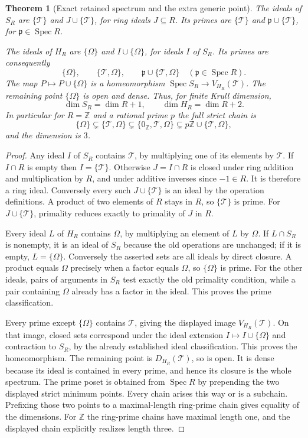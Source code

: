 \documentclass[11pt]{article}
\newtheorem{theorem}{Theorem}
\newcommand{\Z}{\mathbb Z}
\newcommand{\Sp}{\operatorname{Spec}}
\begin{document}
\begin{theorem}[Exact retained spectrum and the extra generic point]
The ideals of $S_R$ are $\{\mathcal T\}$ and $J\cup\{\mathcal T\}$, for ring ideals $J\subseteq R$. Its primes are $\{\mathcal T\}$ and $\mathfrak p\cup\{\mathcal T\}$, for $\mathfrak p\in\Sp R$.

The ideals of $H_R$ are $\{\Omega\}$ and $I\cup\{\Omega\}$, for ideals $I$ of $S_R$. Its primes are consequently
\[
\{\Omega\},\qquad \{\mathcal T,\Omega\},\qquad
\mathfrak p\cup\{\mathcal T,\Omega\}\quad(\mathfrak p\in\Sp R).
\]
The map $P\mapsto P\cup\{\Omega\}$ is a homeomorphism $\Sp S_R\to V_{H_R}(\mathcal T)$. The remaining point $\{\Omega\}$ is open and dense. Thus, for finite Krull dimension,
\[
\dim S_R=\dim R+1,\qquad \dim H_R=\dim R+2.
\]
In particular for $R=\Z$ and a rational prime $p$ the full strict chain is
\[
\{\Omega\}\subsetneq\{\mathcal T,\Omega\}
\subsetneq\{0_{\Z},\mathcal T,\Omega\}
\subsetneq p\Z\cup\{\mathcal T,\Omega\},
\]
and the dimension is $3$.
\end{theorem}
\begin{proof}
Any ideal $I$ of $S_R$ contains $\mathcal T$, by multiplying one of its elements by $\mathcal T$. If $I\cap R$ is empty then $I=\{\mathcal T\}$. Otherwise $J=I\cap R$ is closed under ring addition and multiplication by $R$, and under additive inverses since $-1\in R$. It is therefore a ring ideal. Conversely every such $J\cup\{\mathcal T\}$ is an ideal by the operation definitions. A product of two elements of $R$ stays in $R$, so $\{\mathcal T\}$ is prime. For $J\cup\{\mathcal T\}$, primality reduces exactly to primality of $J$ in $R$.

Every ideal $L$ of $H_R$ contains $\Omega$, by multiplying an element of $L$ by $\Omega$. If $L\cap S_R$ is nonempty, it is an ideal of $S_R$ because the old operations are unchanged; if it is empty, $L=\{\Omega\}$. Conversely the asserted sets are all ideals by direct closure. A product equals $\Omega$ precisely when a factor equals $\Omega$, so $\{\Omega\}$ is prime. For the other ideals, pairs of arguments in $S_R$ test exactly the old primality condition, while a pair containing $\Omega$ already has a factor in the ideal. This proves the prime classification.

Every prime except $\{\Omega\}$ contains $\mathcal T$, giving the displayed image $V_{H_R}(\mathcal T)$. On that image, closed sets correspond under the ideal extension $I\mapsto I\cup\{\Omega\}$ and contraction to $S_R$, by the already established ideal classification. This proves the homeomorphism. The remaining point is $D_{H_R}(\mathcal T)$, so is open. It is dense because its ideal is contained in every prime, and hence its closure is the whole spectrum. The prime poset is obtained from $\Sp R$ by prepending the two displayed strict minimum points. Every chain arises this way or is a subchain. Prefixing those two points to a maximal-length ring-prime chain gives equality of the dimensions. For $\Z$ the ring-prime chains have maximal length one, and the displayed chain explicitly realizes length three.
\end{proof}
\end{document}
